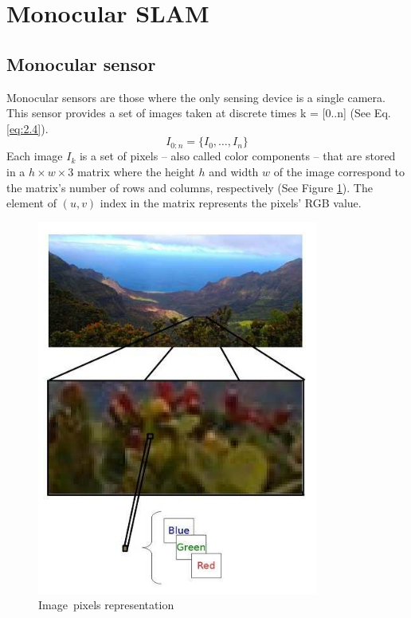 \section{Monocular SLAM}
\subsection{Monocular sensor}
Monocular sensors are those where the only sensing device is a single camera. This sensor provides a set of images taken at discrete times k = [0..n] (See Eq.\ref{eq:2.4}).
\begin{equation} \label{eq:2.4}
    I_{0:n}=\{I_0,\dots,I_n\}
\end{equation}
Each image $I_k$ is a set of pixels – also called color components – that are stored in a $h \times w \times 3 $ matrix where the height $h$ and width $w$ of the image correspond to the matrix’s number of rows and columns, respectively (See Figure \ref{fig:2.9}). The element of $(u, v)$ index in the matrix represents the pixels’ RGB value.
\begin{figure}[H]
    \centering
    \includegraphics[scale=0.6]{assets/2_9.png}
    \caption{{Image\protect\footnotemark ~pixels representation}}
    \label{fig:2.9}
\end{figure}
